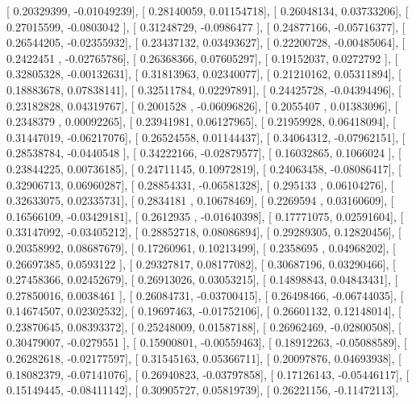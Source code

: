 \documentclass{article}
\begin{document}
       [ 0.20329399, -0.01049239],
       [ 0.28140059,  0.01154718],
       [ 0.26048134,  0.03733206],
       [ 0.27015599, -0.0803042 ],
       [ 0.31248729, -0.0986477 ],
       [ 0.24877166, -0.05716377],
       [ 0.26544205, -0.02355932],
       [ 0.23437132,  0.03493627],
       [ 0.22200728, -0.00485064],
       [ 0.2422451 , -0.02765786],
       [ 0.26368366,  0.07605297],
       [ 0.19152037,  0.0272792 ],
       [ 0.32805328, -0.00132631],
       [ 0.31813963,  0.02340077],
       [ 0.21210162,  0.05311894],
       [ 0.18883678,  0.07838141],
       [ 0.32511784,  0.02297891],
       [ 0.24425728, -0.04394496],
       [ 0.23182828,  0.04319767],
       [ 0.2001528 , -0.06096826],
       [ 0.2055407 ,  0.01383096],
       [ 0.2348379 ,  0.00092265],
       [ 0.23941981,  0.06127965],
       [ 0.21959928,  0.06418094],
       [ 0.31447019, -0.06217076],
       [ 0.26524558,  0.01144437],
       [ 0.34064312, -0.07962151],
       [ 0.28538784, -0.0440548 ],
       [ 0.34222166, -0.02879577],
       [ 0.16032865,  0.1066024 ],
       [ 0.23844225,  0.00736185],
       [ 0.24711145,  0.10972819],
       [ 0.24063458, -0.08086417],
       [ 0.32906713,  0.06960287],
       [ 0.28854331, -0.06581328],
       [ 0.295133  ,  0.06104276],
       [ 0.32633075,  0.02335731],
       [ 0.2834181 ,  0.10678469],
       [ 0.2269594 ,  0.03160609],
       [ 0.16566109, -0.03429181],
       [ 0.2612935 , -0.01640398],
       [ 0.17771075,  0.02591604],
       [ 0.33147092, -0.03405212],
       [ 0.28852718,  0.08086894],
       [ 0.29289305,  0.12820456],
       [ 0.20358992,  0.08687679],
       [ 0.17260961,  0.10213499],
       [ 0.2358695 ,  0.04968202],
       [ 0.26697385,  0.0593122 ],
       [ 0.29327817,  0.08177082],
       [ 0.30687196,  0.03290466],
       [ 0.27458366,  0.02452679],
       [ 0.26913026,  0.03053215],
       [ 0.14898843,  0.04843431],
       [ 0.27850016,  0.0038461 ],
       [ 0.26084731, -0.03700415],
       [ 0.26498466, -0.06744035],
       [ 0.14674507,  0.02302532],
       [ 0.19697463, -0.01752106],
       [ 0.26601132,  0.12148014],
       [ 0.23870645,  0.08393372],
       [ 0.25248009,  0.01587188],
       [ 0.26962469, -0.02800508],
       [ 0.30479007, -0.0279551 ],
       [ 0.15900801, -0.00559463],
       [ 0.18912263, -0.05088589],
       [ 0.26282618, -0.02177597],
       [ 0.31545163,  0.05366711],
       [ 0.20097876,  0.04693938],
       [ 0.18082379, -0.07141076],
       [ 0.26940823, -0.03797858],
       [ 0.17126143, -0.05446117],
       [ 0.15149445, -0.08411142],
       [ 0.30905727,  0.05819739],
       [ 0.26221156, -0.11472113],
\end{document}
